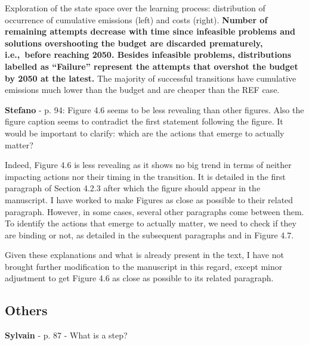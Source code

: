 \documentclass[12pt,a4paper]{article}
\def\ie{i.e.,\ }
\begin{document}
\begin{mdframed}[style=manuscript] %
Exploration of the state space over the learning process: distribution of occurrence of cumulative emissions (left) and costs (right). \textbf{Number of remaining attempts decrease with time since infeasible problems and solutions overshooting the  budget are discarded prematurely, \ie before reaching 2050. Besides infeasible problems, distributions labelled as ``Failure'' represent the attempts that overshot the  budget by 2050 at the latest.} The majority of successful transitions have cumulative emissions much lower than the  budget and are cheaper than the REF case. 
\end{mdframed}

\begin{mdframed}[style=comment] %
{\color{orange} \textbf{Stefano}} - p. 94: Figure 4.6 seems to be less revealing than other figures. Also the figure caption seems to contradict the first statement following the figure. It would be important to clarify: which are the actions that emerge to actually matter?
\end{mdframed}

\noindent Indeed, Figure 4.6 is less revealing as it shows no big trend in terms of neither impacting actions nor their timing in the transition.  It is detailed in the first paragraph of Section 4.2.3 after which the figure should appear in the manuscript. I have worked to make Figures as close as possible to their related paragraph. However, in some cases, several other paragraphs come between them. To identify the actions that emerge to actually matter, we need to check if they are binding or not, as detailed in the subsequent paragraphs and in Figure 4.7.

Given these explanations and what is already present in the text, I have not brought further modification to the manuscript in this regard, except minor adjustment to get Figure 4.6 as close as possible to its related paragraph.


\subsection{Others}


\begin{mdframed}[style=comment] %
{\color{purple} \textbf{Sylvain}} - p. 87 - What is a step?
\end{mdframed}
\end{document}
